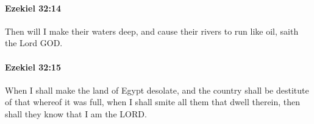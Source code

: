 		\paragraph{Ezekiel 32:14} %
			\label{EZEKIEL-32-14}

			Then will I make their waters deep, and cause their rivers to run like oil, saith the Lord GOD.


		\paragraph{Ezekiel 32:15} %
			\label{EZEKIEL-32-15}

			When I shall make the land of Egypt desolate, and the country shall be destitute of that whereof it was full, when I shall smite all them that dwell therein, then shall they know that I am the LORD.


